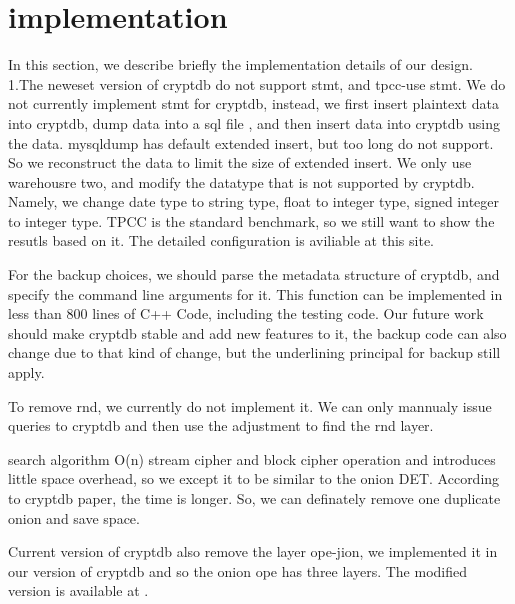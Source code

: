 \section{implementation}

In this section, we describe briefly the implementation details of our design. 1.The neweset version of cryptdb do not support stmt, and tpcc-use stmt. We do not currently implement stmt for cryptdb, instead, we first insert plaintext data into cryptdb, dump data into a sql file , and then insert data into cryptdb using the data. mysqldump has default extended insert, but too long do not support. So we reconstruct the data to limit the size of extended insert. We only use warehousre two, and modify the datatype that is not supported by cryptdb. Namely, we change date type to string type, float to integer type, signed integer to integer type. TPCC is the standard benchmark, so we still want to show the resutls based on it. The detailed configuration is aviliable at this site.

For the backup choices, we should parse the metadata structure of cryptdb, and specify the command line arguments for it. This function can be implemented in less than 800 lines of C++ Code, including the testing code. Our future work should make cryptdb stable and add new features to it, the backup code can also change due to that kind of change, but the underlining principal for backup still apply.

To remove rnd, we currently do not implement it. We can only mannualy issue queries to cryptdb and then use the adjustment to find the rnd layer. 

search\citep{song2000practical} algorithm O(n) stream cipher and block cipher operation and introduces little space overhead, so we except it to be similar to the onion DET. According to cryptdb paper, the time is longer. So, we can definately remove one duplicate onion and save space.


Current version of cryptdb also remove the layer ope-jion, we implemented it in our version of cryptdb and so the onion ope has three layers. The modified version is available at \citep{practical-cryptdb}. 
